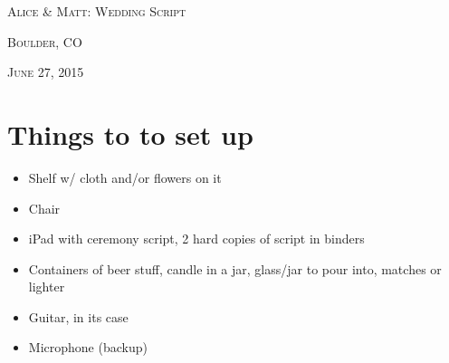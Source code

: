\documentclass[12pt]{article}
\begin{document}
\centering





\textsc{\large Alice \& Matt: Wedding Script}
\vspace*{.2in}


\textsc{\large Boulder, CO}
\vspace*{.01in}

\textsc{\large June 27, 2015}
\vspace*{.25in}

\section*{Things to to set up}

\begin{itemize}
\item Shelf w/ cloth and/or flowers on it
\item Chair
\item iPad with ceremony script, 2 hard copies of script in binders
\item Containers of beer stuff, candle in a jar, glass/jar to pour into, matches or lighter
\item Guitar, in its case
\item Microphone (backup)
\end{itemize}
\end{document}
